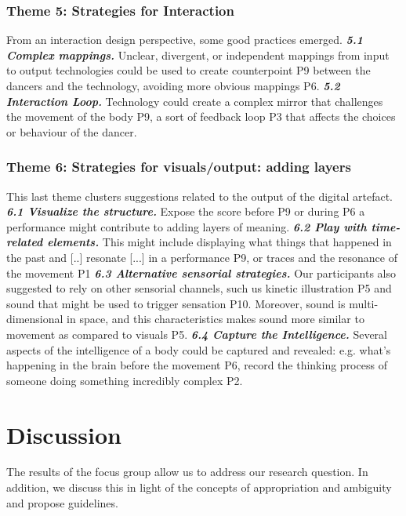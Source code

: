 \subsubsection{\bf Theme 5: Strategies for Interaction} From an interaction design perspective, some good practices emerged. 
\textbf{\textit{5.1 Complex mappings.}} Unclear, divergent, or { independent} mappings from input to output technologies could be used to create { counterpoint} P9 between the dancers and the technology, avoiding more obvious mappings P6.
\textit{\textbf{5.2 Interaction Loop.}} Technology could create a complex mirror that challenges the movement of the body P9, a sort of { feedback loop} P3 that affects the choices or behaviour of the dancer. 

\subsubsection{Theme 6: Strategies for visuals/output: adding layers}This last theme clusters suggestions related to the output of the digital artefact.  \textbf{\textit{6.1 Visualize the structure.}} Expose the { score} before P9 or during P6 a performance might contribute to adding layers of meaning. \textit{\textbf{6.2 Play with time-related elements.}} This might include displaying what { things that happened in the past and [..] resonate [...] in a performance } P9, or { traces and the resonance of the movement} P1 \textit{\textbf{6.3 Alternative sensorial strategies.}} Our participants also suggested to rely on other sensorial channels, such us { kinetic illustration} P5 and { sound} that might be used to { trigger sensation} P10. Moreover, sound is { multi-dimensional in space}, and this characteristics makes sound more similar to movement as compared to visuals P5. \textit{\textbf{6.4 Capture the Intelligence.}} Several aspects of the intelligence of a body could be captured and revealed: e.g. { what's happening in the brain before the movement} P6, { record the thinking process of someone doing something incredibly complex} P2. 

\section{Discussion}

The results of the focus group allow us to address our research question. In addition, we  discuss this in light of the concepts of appropriation and ambiguity and propose guidelines.

